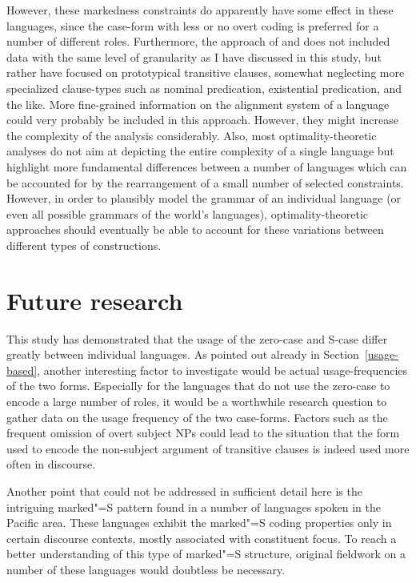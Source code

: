 However, these markedness constraints do apparently have some effect in these languages, since the case-form with less or no overt coding is preferred for a number of different roles.
Furthermore, the approach of \citet{deHoop:2008} and \citet{Malchukov:2011} does not included data with the same level of granularity as I have discussed in this study, but rather have focused on prototypical transitive clauses, somewhat neglecting more specialized clause-types such as nominal predication, existential predication, and the like. 
More fine-grained information on the alignment system of a language could very probably be included in this approach. 
However, they might increase the complexity of the analysis considerably. 
Also, most optimality-theoretic analyses do not aim at depicting the entire complexity of a single language but highlight more fundamental differences between a number of languages which can be accounted for by the rearrangement of a small number of selected constraints. 
However, in order to plausibly model the grammar of an individual language (or even all possible grammars of the world's languages), optimality-theoretic approaches should eventually be able to account for these variations between different types of constructions.
 
\section{Future research}\label{furtherresearch}

This study has demonstrated that the usage of the zero-case and S-case differ greatly between individual languages. 
As pointed out already in Section~\ref{usage-based}, another interesting factor to investigate would be actual usage-fre\-quen\-cies of the two forms. 
Especially for the languages that do not use the zero-case to encode a large number of roles, it would be a worthwhile research question to gather data on the usage frequency of the two case-forms. 
Factors such as the frequent omission of overt subject NPs could lead to the situation that the form used to encode the non-subject argument of transitive clauses is indeed used more often in discourse.   

Another point that could not be addressed in sufficient detail here is the intriguing marked"=S pattern found in a number of languages spoken in the Pacific area. 
These languages exhibit the marked"=S coding properties only in certain discourse contexts, mostly associated with constituent focus. 
To reach a better understanding of this type of marked"=S structure, original fieldwork on a number of these languages would doubtless be necessary. 

